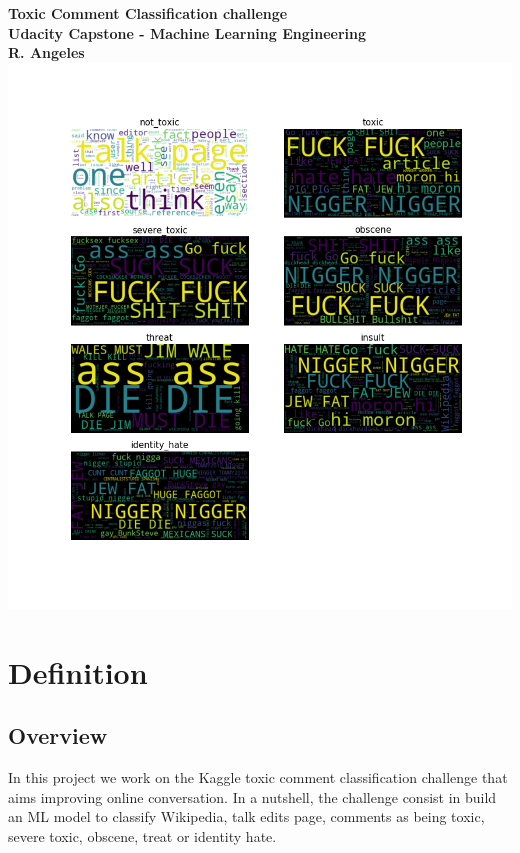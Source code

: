 \documentclass{report}
\begin{document}
\begin{titlepage}
    \centering
    \vfill
    {\bfseries\Large
        Toxic Comment Classification challenge\\
         Udacity Capstone - Machine Learning Engineering\\
        \vskip1cm
        R. Angeles\\
    }    
    \vfill
    \includegraphics[width=15cm]{../local/plots_tables/clouds.png} %
    \vfill
    \vfill
\end{titlepage}




\chapter{Definition}

\section{Overview}

In this project we work on the Kaggle toxic comment classification challenge that aims improving 
online conversation. In a nutshell, the challenge consist in build an ML model to classify 
Wikipedia, talk edits page, comments as being toxic, severe toxic, obscene, treat or identity hate.
\end{document}
